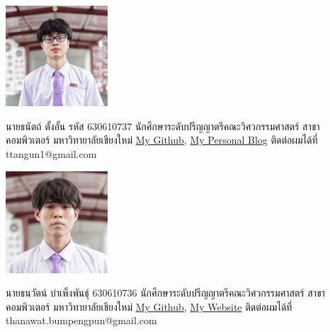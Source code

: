 \documentclass[semifinal]{cpecmu}
\author{ธนัตถ์ ตั้งอั้น}{Tanat Tangun}{630610737}
\author{ธนวัตน์ บำเพ็งพันธุ์}{Thanawat Bumpengpun}{630610736}
\begin{document}


\pagestyle{empty}\cleardoublepage
\normalspacing \setcounter{page}{1}  \pagestyle{cpecmu}





\ifproject
  
\fi



\normalspacing
\appendix


\ifproject
  \ifglossary\glossarypage\fi

  \ifindex\indexpage\fi

  \begin{biosketch}
    \begin{center}
      \includegraphics[width=1.5in]{images/tanat.jpg}
    \end{center}
    นายธนัตถ์ ตั้งอั้น รหัส 630610737 นักศึกษาระดับปรีญญาตรีคณะวิศวกรรมศาสตร์ สาขาคอมพิวเตอร์ มหาวิทายาลัยเชียงใหม่
    \href{https://github.com/RiwEZ}{My Github}, \href{https://riwez.github.io/TanatBlog/}{My Personal Blog} ติดต่อผมได้ที่ ttangun1@gmail.com \\

    \begin{center}
      \includegraphics[width=1.5in]{images/thanawat.jpg}
    \end{center}
    \overfullrule=0pt
    นายธนวัตน์ บำเพ็งพันธุ์ 630610736 นักศึกษาระดับปรีญญาตรีคณะวิศวกรรมศาสตร์ สาขาคอมพิวเตอร์ มหาวิทายาลัยเชียงใหม่
    \href{https://github.com/0736b}{My Github}, \href{https://0736b.github.io/}{My Website} ติดต่อผมได้ที่ thanawat.bumpengpun@gmail.com


  \end{biosketch}

\fi %
\end{document}
